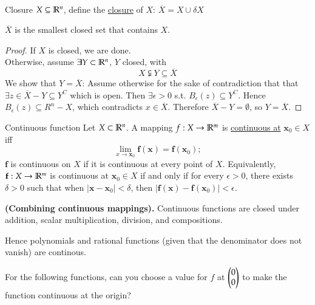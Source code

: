 \\

\begin{defn}{Closure}
  $X \subseteq \mathbb{R}^n$, define the \ul{closure} of $X$: $\overline{X}=X\cup \delta X$
\end{defn}
\begin{theorem}
  $\overline{X}$ is the smallest closed set that contains $X$.
\end{theorem}
\begin{proof}
  If $X$ is closed, we are done. \\
  Otherwise, assume $\exists Y\subset \mathbb{R}^n$, $Y$ closed, with
  \[X\subsetneqq Y \subseteq \overline{X}\]
  We show that $Y=\overline{X}$: Assume otherwise for the sake of contradiction that that $\exists z\in \overline{X} - Y\subseteq Y^C$ which is open. Then $\exists \epsilon > 0$ s.t. $B_\epsilon (z)\subseteq Y^C$. Hence $B_\epsilon (z)\subseteq R^n-X $, which contradicts $x\in \overline{X}$. Therefore $\overline{X}-Y=\emptyset$, so $Y=\overline{X}$.
\end{proof}

\begin{defn}{Continuous function}
Let $X\subset \mathbb{R}^n$. A mapping $f : X\rightarrow \mathbb{R}^m$ is \ul{continuous at} $\bm{x}_0\in X$ iff
  \[\lim_{x\rightarrow \bm{x}_0} \bm{f}(\bm{x}) = \bm{f}(\bm{x}_0);\]
  $\bm{f}$ is continuous on $X$ if it is continuous at every point of $X$. Equivalently, $\textbf{f}: X\rightarrow \mathbb{R}^m$ is continuous at $\bm{x}_0\in X$ if and only if for every $\epsilon > 0$, there exists $\delta>0$ such that when $|\bm{x}-\bm{x}_0|<\delta$, then $|\bm{f}(\bm{x})-\bm{f}(\bm{x}_0)|<\epsilon$.
\end{defn}

\begin{theorem}
  \textbf{(Combining continuous mappings).} Continuous functions are closed under addition, scalar multiplication, division, and compositions.
\end{theorem}

\begin{lemma}
Hence polynomials and rational functions (given that the denominator does not vanish) are continous.
\end{lemma}

 For the following functions, can you choose a value for $f$ at $\begin{pmatrix} 0 \\ 0 \end{pmatrix}$ to make the function continuous at the origin?

